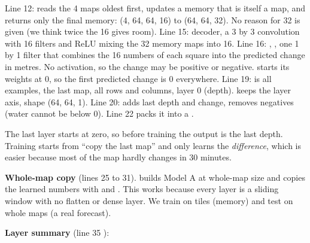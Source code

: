 
Line 12:  reads the 4 maps oldest first, updates a memory that is itself a map, and returns only the final memory: (4, 64, 64, 16) to (64, 64, 32). No reason for 32 is given (we think twice the 16 gives room). Line 15: decoder, a 3 by 3 convolution with 16 filters and ReLU mixing the 32 memory maps into 16. Line 16: , , one 1 by 1 filter that combines the 16 numbers of each square into the predicted change in metres. No activation, so the change may be positive or negative.  starts its weights at 0, so the first predicted change is 0 everywhere. Line 19:  is all examples, the last map, all rows and columns, layer 0 (depth).  keeps the layer axis, shape (64, 64, 1). Line 20:  adds last depth and change,  removes negatives (water cannot be below 0). Line 22 packs it into a .

\begin{thinkbox}
The last layer starts at zero, so before training the output is the last depth. Training starts from ``copy the last map'' and only learns the \emph{difference}, which is easier because most of the map hardly changes in 30 minutes.
\end{thinkbox}

\textbf{Whole-map copy} (lines 25 to 31).  builds Model A at whole-map size and copies the learned numbers with  and . This works because every layer is a sliding window with no flatten or dense layer. We train on tiles (memory) and test on whole maps (a real forecast).

\textbf{Layer summary} (line 35 ):

